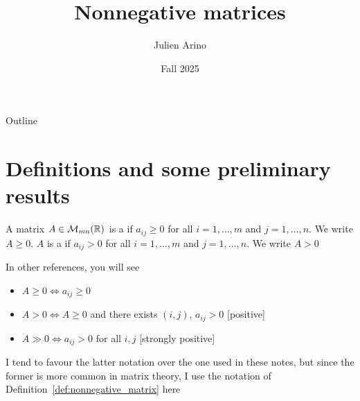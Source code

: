 \documentclass[aspectratio=169]{beamer}
\title{Nonnegative matrices}
\author{Julien Arino}
\date{Fall 2025}
\begin{document}
\begin{frame}
	\titlepage
\end{frame}
\addtocounter{page}{-1}
  
  
\begin{frame}{Outline}
	  \tableofcontents[hideallsubsections]
\end{frame}
\addtocounter{page}{-1}


\section{Definitions and some preliminary results}

\begin{frame}
\begin{definition}
  \label{def:nonnegative_matrix}
A matrix $A\in \mathcal{M}_{mn}(\mathbb{R})$ is a  if $a_{ij}\geq 0$ for all $i=1,\ldots,m$ and $j=1,\ldots,n$. We write $A\geq 0$. $A$ is a  if $a_{ij}>0$ for all $i=1,\ldots,m$ and $j=1,\ldots,n$. We write $A>0$
\end{definition}
\vfill
\begin{remark}
In other references, you will see
\begin{itemize}
    \item $A\geq 0 \iff a_{ij}\geq 0$
    \item $A>0 \iff A\geq 0$ and there exists $(i,j)$, $a_{ij}>0$ 
    \hfill [positive]
    \item $A\gg 0 \iff a_{ij}>0$ for all $i,j$ \hfill [strongly positive]
\end{itemize}
I tend to favour the latter notation over the one used in these notes, but since the former is more common in matrix theory, I use the notation of Definition~\ref{def:nonnegative_matrix} here
\end{remark}
\end{frame}
\end{document}
